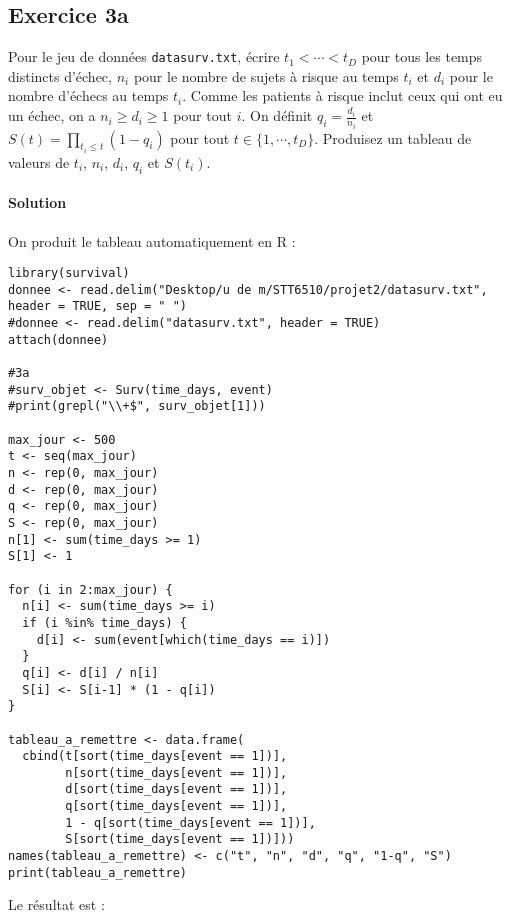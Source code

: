 \documentclass[../main.tex]{subfiles}
\begin{document}
\begin{CJK*}{UTF8}{gbsn}
\section*{Exercice 3a}
Pour le jeu de données 
\texttt{datasurv.txt}, 
écrire $t_1 < \cdots < t_D$ pour tous les temps distincts d'échec, 
$n_i$ pour le nombre de sujets à risque au temps $t_i$
et $d_i$ pour le nombre d'échecs au temps $t_i$.
Comme les patients à risque inclut ceux qui ont eu un échec,
on a $n_i \geqslant d_i \geqslant 1$ pour tout $i$.
On définit $q_i = \frac{d_i}{n_i}$ et $S(t) = \prod_{t_i \leqslant t} (1 - q_i)$
pour tout $t \in \{1, \cdots, t_D\}$.
Produisez un tableau de valeurs de $t_i$, $n_i$, $d_i$, $q_i$ et $S(t_i)$.

\smallskip
\paragraph{Solution}

On produit le tableau automatiquement en R :

\begin{lstlisting}
library(survival)
donnee <- read.delim("Desktop/u de m/STT6510/projet2/datasurv.txt", header = TRUE, sep = " ")
#donnee <- read.delim("datasurv.txt", header = TRUE)
attach(donnee)

#3a
#surv_objet <- Surv(time_days, event)
#print(grepl("\\+$", surv_objet[1]))

max_jour <- 500
t <- seq(max_jour)
n <- rep(0, max_jour)
d <- rep(0, max_jour)
q <- rep(0, max_jour)
S <- rep(0, max_jour)
n[1] <- sum(time_days >= 1)
S[1] <- 1

for (i in 2:max_jour) {
  n[i] <- sum(time_days >= i)
  if (i %in% time_days) {
    d[i] <- sum(event[which(time_days == i)])
  } 
  q[i] <- d[i] / n[i]
  S[i] <- S[i-1] * (1 - q[i])
}

tableau_a_remettre <- data.frame(
  cbind(t[sort(time_days[event == 1])], 
        n[sort(time_days[event == 1])], 
        d[sort(time_days[event == 1])], 
        q[sort(time_days[event == 1])],
        1 - q[sort(time_days[event == 1])],
        S[sort(time_days[event == 1])]))
names(tableau_a_remettre) <- c("t", "n", "d", "q", "1-q", "S")
print(tableau_a_remettre)
\end{lstlisting}

Le résultat est :


\end{CJK*}
\end{document}
